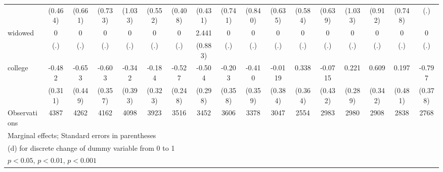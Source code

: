{\begin{tabular}{l*{16}{c}}
                    &     (0.464)         &     (0.661)         &     (0.733)         &     (1.033)         &     (0.552)         &     (0.408)         &     (0.431)         &     (0.741)         &     (0.840)         &     (0.635)         &     (0.584)         &     (0.639)         &     (1.033)         &     (0.912)         &     (0.748)         &         (.)         \\
[1em]
widowed             &           0         &           0         &           0         &           0         &           0         &           0         &       2.441\sym{**} &           0         &           0         &           0         &           0         &           0         &           0         &           0         &           0         &           0         \\
                    &         (.)         &         (.)         &         (.)         &         (.)         &         (.)         &         (.)         &     (0.883)         &         (.)         &         (.)         &         (.)         &         (.)         &         (.)         &         (.)         &         (.)         &         (.)         &         (.)         \\
[1em]
college             &      -0.482         &      -0.653         &      -0.603         &      -0.342         &      -0.184         &      -0.527\sym{*}  &      -0.504         &      -0.203         &      -0.410         &     -0.0119         &       0.338         &     -0.0715         &       0.221         &       0.609         &       0.197         &      -0.797\sym{*}  \\
                    &     (0.311)         &     (0.449)         &     (0.357)         &     (0.393)         &     (0.323)         &     (0.248)         &     (0.298)         &     (0.358)         &     (0.359)         &     (0.384)         &     (0.364)         &     (0.432)         &     (0.289)         &     (0.342)         &     (0.481)         &     (0.378)         \\
\hline
Observations        &        4387         &        4262         &        4162         &        4098         &        3923         &        3516         &        3452         &        3606         &        3378         &        3047         &        2554         &        2983         &        2980         &        2908         &        2838         &        2768         \\
\hline\hline
\multicolumn{17}{l}{\footnotesize Marginal effects; Standard errors in parentheses}\\
\multicolumn{17}{l}{\footnotesize  (d) for discrete change of dummy variable from 0 to 1}\\
\multicolumn{17}{l}{\footnotesize \sym{*} \(p<0.05\), \sym{**} \(p<0.01\), \sym{***} \(p<0.001\)}\\
\end{tabular}
}
